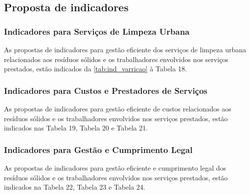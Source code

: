 	\subsection{Proposta de indicadores}
	\subsubsection{Indicadores para Serviços de Limpeza Urbana }
	As propostas de indicadores para gestão eficiente dos serviços de limpeza urbana relacionados aos resíduos sólidos e os trabalhadores envolvidos nos serviços prestados, estão indicados da \autoref{tab:ind_varricao} à Tabela 18.
	
	
	
	
	
	
	
	
	
	
	
	
	
	
	
	
	
	
	
	
	
	
	
	
	
	\subsubsection{Indicadores para Custos e Prestadores de Serviços}
	As propostas de indicadores para gestão eficiente de custos relacionados aos resíduos sólidos e os trabalhadores envolvidos nos serviços prestados, estão indicados nas Tabela 19, Tabela 20 e Tabela 21.
	
	
	
	
	
	
	
	\subsubsection{Indicadores para Gestão e Cumprimento Legal }
	As propostas de indicadores para gestão eficiente e cumprimento legal dos resíduos sólidos e os trabalhadores envolvidos nos serviços prestados, estão indicados na Tabela 22, Tabela 23 e Tabela 24.
	

